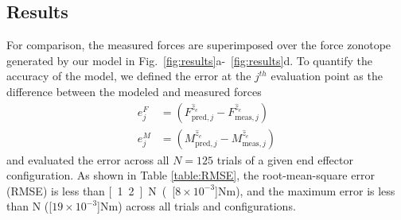 \subsection{Results}


For comparison, the measured forces are superimposed over the force zonotope generated by our model in Fig.~\ref{fig:results}a-~\ref{fig:results}d.
To quantify the accuracy of the model, we defined the error at the $j^{th}$ evaluation point as the difference between the modeled and measured forces
\begin{align}
    e^F_j &= \left( F^{\hat{z}_e}_{\text{pred}, j} - F^{\hat{z}_e}_{\text{meas}, j} \right) \\
    e^M_j &= \left( M^{\hat{z}_e}_{\text{pred}, j} - M^{\hat{z}_e}_{\text{meas}, j} \right)
\end{align}
and evaluated the error across all $N = 125$ trials of a given end effector configuration.
As shown in Table \ref{table:RMSE}, the root-mean-square error (RMSE) is less than \unit[1.2]{N} (\unit[${8 \times 10^{-3}}$]{Nm}), and the maximum error is less than \unit[3]{N}  (\unit[${19 \times 10^{-3}}$]{Nm}) across all trials and configurations.

